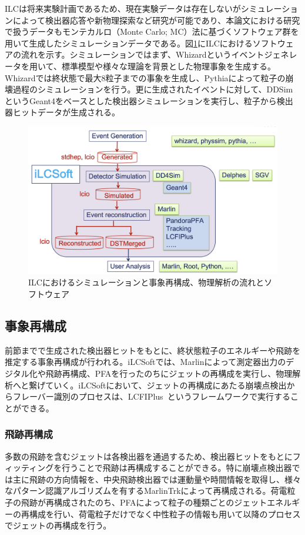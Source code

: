 ILCは将来実験計画であるため、現在実験データは存在しないがシミュレーションによって検出器応答や新物理探索など研究が可能であり、本論文における研究で扱うデータもモンテカルロ（Monte Carlo; MC）法に基づくソフトウェア群を用いて生成したシミュレーションデータである。図\ref{ilcsoft}にILCにおけるソフトウェアの流れを示す。シミュレーションではまず、Whizardというイベントジェネレータを用いて、標準模型や様々な理論を背景とした物理事象を生成する。Whizardでは終状態で最大8粒子までの事象を生成し、Pythiaによって粒子の崩壊過程のシミュレーションを行う。更に生成されたイベントに対して、DDSimというGeant4をベースとした検出器シミュレーションを実行し、粒子から検出器ヒットデータが生成される。
\begin{figure}[h]
	\begin{center}
 \includegraphics[keepaspectratio, scale=0.25]
 	{Figure/Introduction/ilcsoft.png}
 		\caption {ILCにおけるシミュレーションと事象再構成、物理解析の流れとソフトウェア}
 		\label{ilcsoft}
	\end{center}
\end{figure}

\subsection{事象再構成}
前節までで生成された検出器ヒットをもとに、終状態粒子のエネルギーや飛跡を推定する事象再構成が行われる。iLCSoftでは、Marlinによって測定器出力のデジタル化や飛跡再構成、PFAを行ったのちにジェットの再構成を実行し、物理解析へと繋げていく。iLCSoftにおいて、ジェットの再構成にあたる崩壊点検出からフレーバー識別のプロセスは、LCFIPlus~\cite{lcfiplus}というフレームワークで実行することができる。

\subsubsection{飛跡再構成}
多数の飛跡を含むジェットは各検出器を通過するため、検出器ヒットをもとにフィッティングを行うことで飛跡は再構成することができる。特に崩壊点検出器では主に飛跡の方向情報を、中央飛跡検出器では運動量や時間情報を取得し、様々なパターン認識アルゴリズムを有するMarlinTrkによって再構成される。荷電粒子の飛跡が再構成されたのち、PFAによって粒子の種類ごとのジェットエネルギーの再構成を行い、荷電粒子だけでなく中性粒子の情報も用いて以降のプロセスでジェットの再構成を行う。

